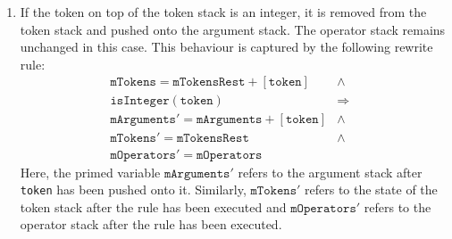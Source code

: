 \begin{enumerate}
\item If the token on top of the token stack is an integer, it is removed from the token stack and pushed onto
      the argument stack.  The operator stack remains unchanged in this case.
      This behaviour is captured by the following rewrite rule:
      $$\begin{array}{lcll}
          \texttt{mTokens} = \texttt{mTokensRest} + [\texttt{token} ] & \wedge & \\
          \texttt{isInteger}(\texttt{token}) & \Rightarrow  \\[0.2cm]
                   \texttt{mArguments}' = \texttt{mArguments} + [\texttt{token}] & \wedge \\
                   \texttt{mTokens}' = \texttt{mTokensRest} & \wedge \\
                   \texttt{mOperators}' = \texttt{mOperators}
       \end{array} 
     $$
      Here, the primed variable $\texttt{mArguments}'$ refers to the argument stack after \texttt{token} 
      has been pushed onto it.  Similarly, $\mathtt{mTokens}'$ refers to the state of the token stack after the
      rule has been executed and $\mathtt{mOperators}'$ refers to the operator stack after the rule has been executed.
   

\end{enumerate}
